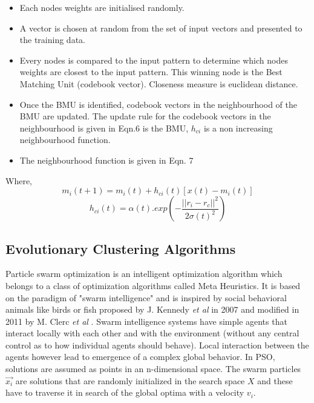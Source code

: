 \documentclass[conference]{IEEEtran}
\begin{document}
\begin{itemize}
\item Each nodes weights are initialised randomly.
\item A vector is chosen at random from the set of input vectors and presented to the training data.
\item Every nodes is compared to the input pattern to determine which nodes weights are closest to the input pattern. This winning node is the Best Matching Unit (codebook vector). Closeness measure is euclidean distance.
\item Once the BMU is identified, codebook vectors in the neighbourhood of the BMU are updated. The update rule for the codebook vectors in the neighbourhood is given in Eqn.6 is the BMU, $h_{ci}$ is a non increasing neighbourhood function.
\item The neighbourhood function is given in Eqn. 7\\  
\end{itemize}

Where,
\begin{equation}
m_i(t+1) = m_i(t) + h_{ci}(t)[x(t) - m_i(t)]
\end{equation}
\begin{equation}
h_{ci}(t) = \alpha(t) . exp(- \frac{||r_i - r_c||^2}{2 \sigma(t)^2})
\end{equation}


\subsection{Evolutionary Clustering Algorithms}
Particle swarm optimization is an intelligent optimization algorithm which belongs to a class of optimization algorithms called Meta Heuristics. It is based on the paradigm of "swarm intelligence" and is inspired by social behavioral animals like birds or fish proposed by J. Kennedy \textit{et al} in 2007 and modified in 2011 by M. Clerc \textit{et al} \cite{pso}\cite{pso1}\cite{pso2}. Swarm intelligence systems have simple agents that interact locally with each other and with the environment (without any central control as to how individual agents should behave). Local interaction between the agents however lead to emergence of a complex global behavior. In PSO, solutions are assumed as points in an n-dimensional space. The swarm particles $\overrightarrow{x_i}$ are solutions that are randomly initialized in the search space $X$ and these have to traverse it in search of the global optima with a velocity $v_i$. \\
\end{document}
